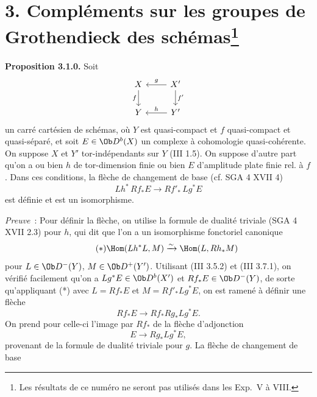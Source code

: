 \section*{3. Compléments sur les groupes de Grothendieck des schémas\protect\footnote{Les résultats de ce numéro ne seront pas utilisés dans les Exp.\ V à VIII.}}

\textbf{Proposition 3.1.0.} Soit
\[
\begin{tikzcd}
X \arrow[d,"f"'] & X' \arrow[l,"g"']\arrow[d,"f'"]\\
Y & Y' \arrow[l,"h"']
\end{tikzcd}
\]
un carré cartésien de schémas, où \(Y\) est quasi-compact et \(f\) quasi-compact et quasi-séparé, et soit \(E\in\Ob D^b(X)\) un complexe à cohomologie quasi-cohérente. On suppose \(X\) et \(Y'\) tor-indépendants sur \(Y\) (III 1.5). On suppose d'autre part qu'on a ou bien \(h\) de tor-dimension finie ou bien \(E\) d'amplitude plate finie rel. à \(f\). Dans ces conditions, la flèche de changement de base (cf. SGA 4 XVII 4)
\[
 Lh^*\,Rf_*E\longrightarrow Rf'_*\,Lg^*E
\]
est définie et est un isomorphisme.

\emph{Preuve}~: Pour définir la flèche, on utilise la formule de dualité triviale (SGA 4 XVII 2.3) pour \(h\), qui dit que l'on a un isomorphisme fonctoriel canonique
\begin{equation}\tag{$*$}
 \Hom(Lh^*L,M)\xrightarrow{\sim}\Hom(L,Rh_*M)
\end{equation}
pour \(L\in\Ob D^-(Y)\), \(M\in\Ob D^+(Y')\). Utilisant (III 3.5.2) et (III 3.7.1), on vérifié facilement qu'on a \(Lg^*E\in\Ob D^b(X')\) et \(Rf_*E\in\Ob D^-(Y)\), de sorte qu'appliquant (*) avec \(L=Rf_*E\) et \(M=Rf'_*Lg^*E\), on est ramené à définir une flèche
\[
 Rf_*E\longrightarrow Rf_*Rg_*Lg^*E.
\]
On prend pour celle-ci l'image par \(Rf_*\) de la flèche d'adjonction
\[
 E\longrightarrow Rg_*Lg^*E,
\]
provenant de la formule de dualité triviale pour \(g\). La flèche de changement de base 
